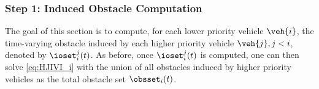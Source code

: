 %

\subsubsection{Step 1: Induced Obstacle Computation \label{sec:intruder_iocomp}}
The goal of this section is to compute, for each lower priority vehicle $\veh{i}$, the time-varying obstacle induced by each higher priority vehicle $\veh{j}, j < i$, denoted by $\ioset_i^j(t)$. As before, once $\ioset_i^j(t)$ is computed, one can then solve \eqref{eq:HJIVI_i} with the union of all obstacles induced by higher priority vehicles as the total obstacle set $\obsset_i(t)$. 

